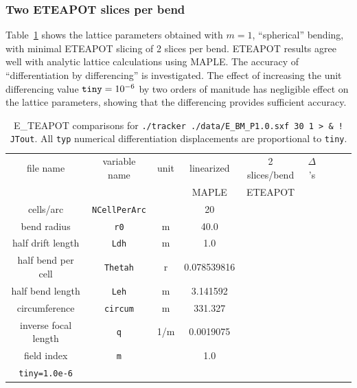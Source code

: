\documentclass[12pt]{article}
\begin{document}
\subsubsection{Two ETEAPOT slices per bend}
Table~\ref{tbl:benchmarkParams.P1.0} shows the lattice parameters obtained
with $m=1$, ``spherical'' bending, with minimal ETEAPOT slicing of 2 slices per bend.
ETEAPOT results agree well with analytic lattice calculations using MAPLE. The 
accuracy of ``differentiation by differencing'' is investigated. The effect of
increasing the unit differencing value ${\tt tiny}=10^{-6}$ by two orders of manitude
has negligible effect on the lattice parameters, showing that the differencing provides
sufficient accuracy.

\begin{table}[h]
\caption{\label{tbl:benchmarkParams.P1.0}E\_TEAPOT comparisons for
{\tt ./tracker ./data/E\_BM\_P1.0.sxf 30 1 > \& ! JTout}.
All {\tt typ} numerical differentiation displacements are proportional to {\tt tiny}.} 
\medskip
\centering
\begin{tabular}{|c|c|c|c|c|c|c|c|c|}           \hline
file name         & variable name     & unit  &   linearized  & 2 slices/bend & $\Delta$'s  \\ 
                  &                   &       &   MAPLE       &  ETEAPOT      &             \\ \hline
cells/arc         & {\tt NCellPerArc} &       &        20     &               &             \\
bend radius       &  {\tt r0}         &  m    &       40.0    &               &             \\
half drift length &  {\tt Ldh}        &  m    &        1.0    &               &        \\
half bend per cell & {\tt Thetah}     &  r    &  0.078539816  &               &        \\
half bend length  & {\tt Leh}         &  m    &   3.141592    &               &        \\
circumference     & {\tt circum}      &  m    &    331.327    &               &        \\ 
inverse focal length &  {\tt q}       & 1/m   &     0.0019075 &               &        \\
field index       &  {\tt m}          &       &         1.0   &               &         \\ \hline 
{\tt tiny=1.0e-6} &                   &       &               &               &          \\ \hline

\end{tabular}
\end{table}
\end{document}
